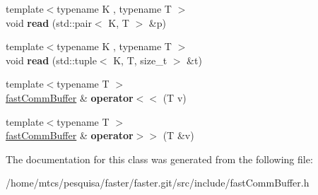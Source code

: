 \begin{DoxyCompactItemize}
\item 
\hypertarget{classfaster_1_1fastCommBuffer_aa53c0eac8725e8a0ea773bd027b7be32}{}{\footnotesize template$<$typename K , typename T $>$ }\\void {\bfseries read} (std\+::pair$<$ K, T $>$ \&p)\label{classfaster_1_1fastCommBuffer_aa53c0eac8725e8a0ea773bd027b7be32}

\item 
\hypertarget{classfaster_1_1fastCommBuffer_afe0968b6a32dbafdd87639262e21ea0f}{}{\footnotesize template$<$typename K , typename T $>$ }\\void {\bfseries read} (std\+::tuple$<$ K, T, size\+\_\+t $>$ \&t)\label{classfaster_1_1fastCommBuffer_afe0968b6a32dbafdd87639262e21ea0f}

\item 
\hypertarget{classfaster_1_1fastCommBuffer_a0b4e973082ad897d135a5a454a06623f}{}{\footnotesize template$<$typename T $>$ }\\\hyperlink{classfaster_1_1fastCommBuffer}{fast\+Comm\+Buffer} \& {\bfseries operator$<$$<$} (T v)\label{classfaster_1_1fastCommBuffer_a0b4e973082ad897d135a5a454a06623f}

\item 
\hypertarget{classfaster_1_1fastCommBuffer_a957e261de1a95762b9730a0322f5d341}{}{\footnotesize template$<$typename T $>$ }\\\hyperlink{classfaster_1_1fastCommBuffer}{fast\+Comm\+Buffer} \& {\bfseries operator$>$$>$} (T \&v)\label{classfaster_1_1fastCommBuffer_a957e261de1a95762b9730a0322f5d341}

\end{DoxyCompactItemize}


The documentation for this class was generated from the following file\+:\begin{DoxyCompactItemize}
\item 
/home/mtcs/pesquisa/faster/faster.\+git/src/include/fast\+Comm\+Buffer.\+h\end{DoxyCompactItemize}
